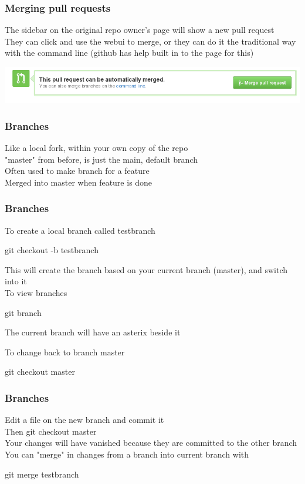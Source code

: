 \documentclass[xcolor=dvipsnames]{beamer}
\begin{document}
\begin{frame}
    \frametitle{Merging pull requests}

    The sidebar on the original repo owner's page will show a new pull request\\
    They can click and use the webui to merge, or they can do it the traditional way with the command line (github has help built in to the page for this)

    \begin{center}
        \includegraphics[scale=0.4]{gh-mergepullrequest.png}
    \end{center}
\end{frame}

\begin{frame}
    \frametitle{Branches}
    
    Like a local fork, within your own copy of the repo\\
    "master" from before, is just the main, default branch\\
    Often used to make branch for a feature\\
    Merged into master when feature is done\\
\end{frame}

\begin{frame}
    \frametitle{Branches}

    To create a local branch called testbranch
    \begin{block}{}
        git checkout -b testbranch
    \end{block}
    This will create the branch based on your current branch (master), and switch into it\\

    To view branches
    \begin{block}{}
        git branch
    \end{block}
    The current branch will have an asterix beside it

    To change back to branch master
    \begin{block}{}
        git checkout master
    \end{block}
\end{frame}

\begin{frame}
    \frametitle{Branches}
        Edit a file on the new branch and commit it\\
        Then git checkout master\\
        Your changes will have vanished because they are committed to the other branch\\
        You can "merge" in changes from a branch into current branch with
        \begin{block}{}
            git merge testbranch
        \end{block}
\end{frame}
\end{document}
